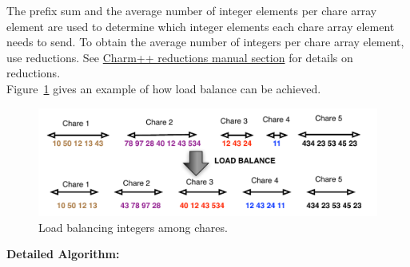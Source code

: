 \documentclass{article}
\begin{document}
The prefix sum and the average number of integer elements per chare array
element are used to
determine which integer elements each chare  array element needs to send.  To
obtain the average number of integers per chare array element, use reductions.
See
\href{http://charm.cs.uiuc.edu/manuals/html/charm++/4.html#SECTION01361000000000000000}{Charm++
reductions manual section} for details on reductions.\\ 

Figure~\ref{prefix} gives an example of how load balance can be achieved.\\



\begin{figure}[h]
\centering
\includegraphics[width=\textwidth]{prob1.pdf}
\caption{Load balancing integers among chares.}
\label{prefix}
\end{figure}


\textbf{Detailed Algorithm:} 
\end{document}
